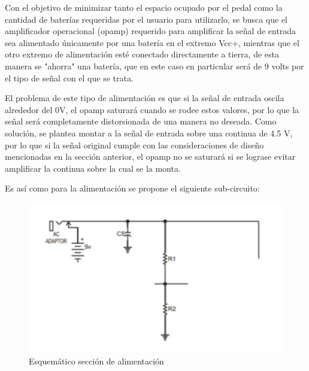 \documentclass[../../main.tex]{subfiles}
\begin{document}
Con el objetivo de minimizar tanto el espacio ocupado por el pedal como la cantidad de baterías requeridas por el usuario para utilizarlo, se busca que el amplificador operacional (opamp) requerido para amplificar la señal de entrada sea alimentado únicamente por una batería en el extremo Vcc+, mientras que el otro extremo de alimentación esté conectado directamente a tierra, de esta manera se "ahorra" una batería, que en este caso en particular será de 9 volts por el tipo de señal con el que se trata. \par 
El problema de este tipo de alimentación es que si la señal de entrada oscila alrededor del 0V, el opamp saturará cuando se rodee estos valores, por lo que la señal será completamente distorsionada de una manera no deseada. Como solución, se plantea montar a la señal de entrada sobre una continua de 4.5 V, por lo que si la señal original cumple con las consideraciones de diseño mencionadas en la sección anterior, el opamp no se saturará si se lograse evitar amplificar la continua sobre la cual se la monta. \par
Es así como para la alimentación se propone el siguiente sub-circuito:

\begin{figure}[H]	%
	\centering
	\includegraphics[scale=1]{imagenes/esquematico_alimentacion.png}
	\caption{Esquem\'atico secci\'on de alimentaci\'on}
	\label{fig:ej5_esquematico_alimentacion}
\end{figure}
\end{document}
